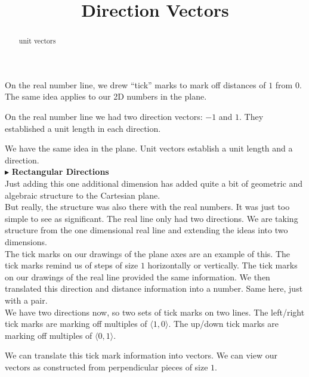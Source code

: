 \documentclass{ximera}
\title{Direction Vectors}
\begin{document}
\begin{abstract}
unit vectors
\end{abstract}
\maketitle




On the real number line, we drew ``tick'' marks to mark off distances of $1$ from $0$.  The same idea applies to our 2D numbers in the plane. 

On the real number line we had two direction vectors: $-1$ and $1$.  They established a unit length in each direction.

We have the same idea in the plane.  Unit vectors establish a unit length and a direction. \\







$\blacktriangleright$ \textbf{Rectangular Directions} \\

Just adding this one additional dimension has added quite a bit of geometric and algebraic structure to the Cartesian plane.  \\  


But really, the structure was also there with the real numbers.  It was just too simple to see as significant.  The real line only had two directions. We are taking structure from the one dimensional real line and extending the ideas into two dimensions. \\ 



The tick marks on our drawings of the plane axes are an example of this. The tick marks remind us of steps of size $1$ horizontally or vertically. The tick marks on our drawings of the real line provided the same information.  We then translated this direction and distance information into a number. Same here, just with a pair.\\


We have two directions now, so two sets of tick marks on two lines.  The left/right tick marks are marking off multiples of $\langle 1, 0 \rangle$. The up/down tick marks are marking off multiples of $\langle 0, 1 \rangle$.





We can translate this tick mark information into vectors.  We can view our vectors as constructed from perpendicular pieces of size $1$.
\end{document}
